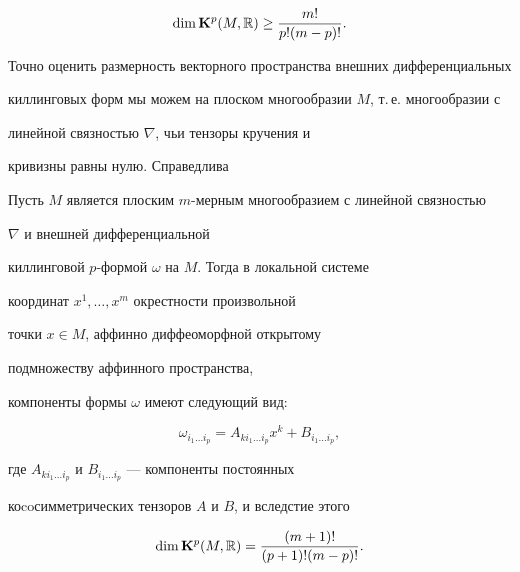 $$


\dim {\bold K}^p(M,\Bbb R)\ge \frac{m!}{p!(m-p)!}.


$$





Точно оценить размерность векторного пространства внешних дифференциальных


киллинговых форм мы можем на плоском многообразии $M$, т.\,е. многообразии с


линейной связностью $\nabla$, чьи тензоры кручения и 


кривизны равны нулю. Справедлива





\begin{thms}


Пусть $M$ является плоским $m$-мерным многообразием с линейной связностью


$\nabla$ и  внешней дифференциальной 


киллинговой $p$-формой $\omega$ на $M$. Тогда в локальной системе 


координат $x^1,\dotsc,x^m$ окрестности произвольной


точки $x\in M$, аффинно диффеоморфной открытому 


подмножеству аффинного пространства, 


компоненты формы $\omega$ имеют следующий вид${:}$


\begin{equation}


\omega_{i_1 \dotsc i_p}=A_{ki_1 \dotsc i_p}x^k+B_{i_1 \dotsc i_p}, 


\end{equation}


где $A_{ki_1 \dotsc i_p}$ и $B_{i_1 \dotsc i_p}$ --- компоненты постоянных


коcoсимметрических тензоров $A$ и $B$, и вследстие этого


$$


\dim {\bold K}^p(M,\Bbb R)=\frac{(m+1)!}{(p+1)!(m-p)!}.


$$


\end{thms}





